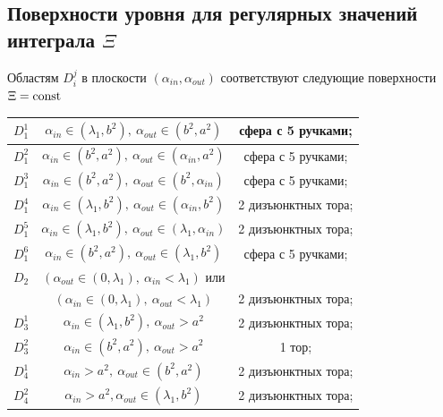 \subsection{Поверхности уровня для регулярных значений интеграла $\Xi$}
\begin{theorem} 
Областям $D_i^j$ в плоскости $(\alpha_{in}, \alpha_{out})$ соответствуют следующие поверхности $\Xi = \mathrm{const}$
\medskip
\begin{center}
\begin{tabular}{|c|c|c|}
\hline 
$D_1^1$  	& 	$\alpha_{in} \in (\lambda_1, b^2), \ \alpha_{out} \in (b^2, a^2)$			& сфера с 5 ручками; \\ \hline 
$D_1^2$  	& 	$\alpha_{in} \in (b^2, a^2), \ \alpha_{out} \in (\alpha_{in}, a^2)$				& сфера с 5 ручками; \\ \hline 
$D_1^3$  	& 	$\alpha_{in} \in (b^2, a^2), \ \alpha_{out} \in (b^2, \alpha_{in})$				& сфера с 5 ручками; \\ \hline 
$D_1^4$ 	& 	$\alpha_{in} \in (\lambda_1, b^2), \ \alpha_{out} \in (\alpha_{in}, b^2)$	& 2 дизъюнктных тора; \\ \hline 
$D_1^5$  	& 	$\alpha_{in} \in (\lambda_1, b^2), \ \alpha_{out} \in (\lambda_1, \alpha_{in})$	& 2 дизъюнктных тора; \\ \hline 
$D_1^6$  	& 	$\alpha_{in} \in (b^2, a^2), \ \alpha_{out} \in (\lambda_1, b^2)$			& сфера с 5 ручками; \\ \hline 
\hline
$D_2$  	& 	$(\alpha_{out} \in (0, \lambda_1), \ \alpha_{in} < \lambda_1)$ или & \\
		&  $(\alpha_{in} \in (0, \lambda_1), \ \alpha_{out} < \lambda_1)$				& 2 дизъюнктных тора; \\ \hline
 \hline
$D_3^1$  	& 	$\alpha_{in} \in (\lambda_1, b^2), \ \alpha_{out} > a^2$				& 2 дизъюнктных тора; \\ \hline 
$D_3^2$  	& 	$\alpha_{in} \in (b^2, a^2), \ \alpha_{out} > a^2 $					& 1 тор; \\ \hline 
\hline 
$D_4^1$  	& 	$\alpha_{in} > a^2, \ \alpha_{out} \in (b^2, a^2)$						& 2 дизъюнктных тора; \\ \hline 
$D_4^2$  	& 	$\alpha_{in} > a^2, \alpha_{out} \in (\lambda_1, b^2)$				& 2 дизъюнктных тора; \\ \hline 
\end{tabular}
\end{center}
%
%

\end{theorem}
